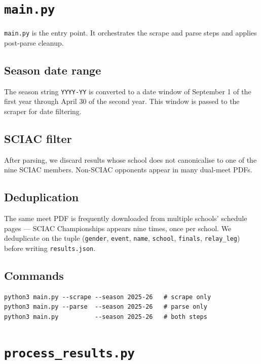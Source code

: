\documentclass{article}
\begin{document}
\section{\texttt{main.py}}

\texttt{main.py} is the entry point. It orchestrates the scrape and parse
steps and applies post-parse cleanup.

\subsection*{Season date range}

The season string \texttt{YYYY-YY} is converted to a date window of
September 1 of the first year through April 30 of the second year. This window
is passed to the scraper for date filtering.

\subsection*{SCIAC filter}

After parsing, we discard results whose school does not canonicalise to one of
the nine SCIAC members. Non-SCIAC opponents appear in many dual-meet PDFs.

\subsection*{Deduplication}

The same meet PDF is frequently downloaded from multiple schools' schedule
pages --- SCIAC Championships appears nine times, once per school. We
deduplicate on the tuple
(\texttt{gender}, \texttt{event}, \texttt{name}, \texttt{school},
\texttt{finals}, \texttt{relay\_leg})
before writing \texttt{results.json}.

\subsection*{Commands}
\begin{lstlisting}
python3 main.py --scrape --season 2025-26   # scrape only
python3 main.py --parse  --season 2025-26   # parse only
python3 main.py          --season 2025-26   # both steps
\end{lstlisting}

\section{\texttt{process\_results.py}}
\end{document}
